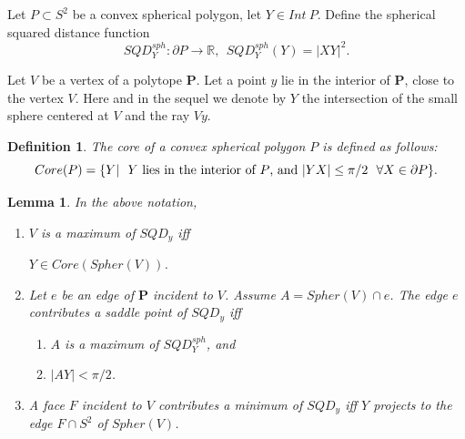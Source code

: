\documentclass[12pt]{amsart}
\newtheorem{lemma}{Lemma}
\newtheorem*{main lemma}{The main lemma}
\newtheorem{definition}{Definition}
\begin{document}
Let $P\subset S^2$ be a convex spherical polygon, let $Y\in Int~P$. Define the spherical squared distance function
$$SQD_Y^{sph}:  \partial P \rightarrow \mathbb{R}, \ \ SQD_Y^{sph}(Y)=|XY|^2.$$





Let $V$ be a vertex of a polytope $\mathbf{P}$. Let a point $y$ lie in the interior of $\mathbf{P}$, close to the vertex $V$. Here and in the sequel we denote by $Y$ the intersection of the small sphere centered at $V$ and the ray $Vy$.

\begin{definition}
 
 The core   of a convex spherical polygon $P$ is defined as follows:
 $$Core(P)=\{Y|  \ \ Y \hbox{ lies  in the interior of $P$, and } |YX|\leq \pi/2 \ \ \forall  X \in \partial P\}.$$
\end{definition}


\begin{lemma}\label{LemmaCriterionMaxMin Sadd}
  In the above notation,  \begin{enumerate}
                          \item $V$ is a  maximum of   $SQD_y$  iff
                         
                           $Y \in Core(Spher(V))$.
                           
                          \item Let $e$ be an edge of $\mathbf{P}$ incident to $V$. Assume  $A= Spher(V)\cap e$. The edge $e$ contributes  a saddle point of   $SQD_y$  iff \begin{enumerate}
                                                                                           \item $A$ is a  maximum of $SQD_Y^{sph}$, and
                                                                                           \item $|AY|<\pi/2$.
                                                                                         \end{enumerate}
                          \item A  face $F$  incident to $V$ contributes  a minimum of   $SQD_y$  iff  $Y$ projects to the edge  $F\cap S^2$ of $Spher(V)$.
                                                                                           
                        \end{enumerate}
\end{lemma}
\end{document}
